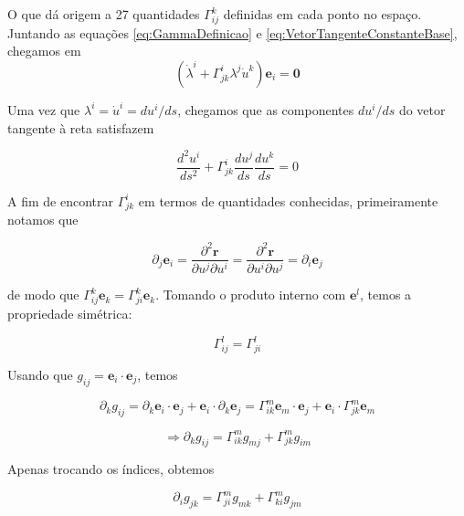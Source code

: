 O que dá origem a 27 quantidades $ \Gamma_{i j}^{k} $ definidas em cada ponto no espaço. Juntando as equações \eqref{eq:GammaDefinicao} e \eqref{eq:VetorTangenteConstanteBase}, chegamos em
\begin{equation}\label{eq:CoordenadasLambdaE}
	\left(\dot{\lambda}^{i}+\Gamma_{j k}^{i} \lambda^{j} \dot{u}^{k}\right) \mathbf{e}_{i}=\mathbf{0}
\end{equation}

Uma vez que $ \lambda^{i}=\dot{u}^{i}=d u^{i} / d s $, chegamos que as componentes $ d u^{i} / d s $ do vetor tangente à reta satisfazem

\begin{equation}\label{eq:ComponentesUGamma}
\frac{d^{2} u^{i}}{d s^{2}}+\Gamma_{j k}^{i} \frac{d u^{j}}{d s} \frac{d u^{k}}{d s}=0
\end{equation} 

A fim de encontrar $ \Gamma_{j k}^{i} $ em termos de quantidades conhecidas, primeiramente notamos que

\[
\partial_{j} \mathbf{e}_{i}=\frac{\partial^{2} \mathbf{r}}{\partial u^{j} \partial u^{i}}=\frac{\partial^{2} \mathbf{r}}{\partial u^{i} \partial u^{j}}=\partial_{i} \mathbf{e}_{j}
\]

de modo que $ \Gamma_{i j}^{k} \mathbf{e}_{k}=\Gamma_{j i}^{k} \mathbf{e}_{k} $. Tomando o produto interno com $ \mathbf{e}^{l} $, temos a propriedade simétrica:


\begin{equation}\label{eq:GammaSimetria}
\boxed{\Gamma_{i j}^{l}=\Gamma_{j i}^{l}}
\end{equation}

Usando que $ g_{i j}=\mathbf{e}_{i} \cdot \mathbf{e}_{j} $, temos

\[
\partial_{k} g_{i j}=\partial_{k} \mathbf{e}_{i} \cdot \mathbf{e}_{j}+\mathbf{e}_{i} \cdot \partial_{k} \mathbf{e}_{j}=\Gamma_{i k}^{m} \mathbf{e}_{m} \cdot \mathbf{e}_{j}+\mathbf{e}_{i} \cdot \Gamma_{j k}^{m} \mathbf{e}_{m}
\]


\begin{equation}\label{eq:deltak}
\Rightarrow \partial_{k} g_{i j}=\Gamma_{i k}^{m} g_{m j}+\Gamma_{j k}^{m} g_{i m}
\end{equation}

Apenas trocando os índices, obtemos

\begin{equation}\label{eq:deltai}
\partial_{i} g_{j k}=\Gamma_{j i}^{m} g_{m k}+\Gamma_{k i}^{m} g_{j m}
\end{equation}

